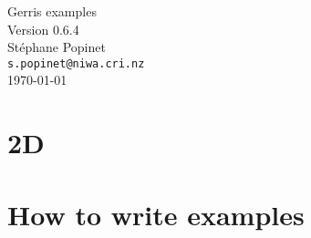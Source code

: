 \documentclass[a4paper]{article}
\begin{document}
\mbox{}\vspace{1cm}
\begin{center}
{\huge Gerris examples}\\
{\large Version 0.6.4}\\
\vspace{5mm}
{\large St\'ephane Popinet\\
{\tt s.popinet@niwa.cri.nz}\\
\vspace{5mm}
\today}
\vspace{1cm}
\end{center}

\tableofcontents
\newpage

\section{2D}




\section{How to write examples}
\end{document}
